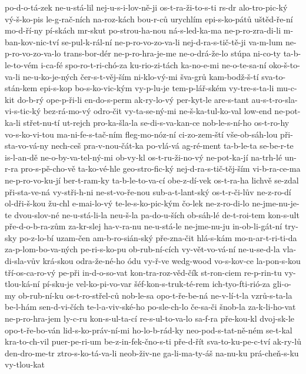 {po-d-o-tá-zek
ne-u-stá-lil
nej-u-s-i-lov-ně-ji
os-t-ra-ži-to-s-ti
rs-dr
alo-tro-pic-ký
vý-š-ko-pis
le-g-rač-ních
na-roz-kách
bou-r-ců
urychlím
epi-s-ko-pátů
uštěd-ře-ní
mo-d-ří-ny
pí-skách
mr-skut
po-strou-ha-nou
ná-s-led-ka-ma
ne-p-ro-zra-di-li
m-ban-kov-nic-tví
se-pul-k-rál-ní
ne-p-ro-vo-zo-va-li
nej-d-ra-s-tič-tě-ji
va-m-lum
ne-p-ro-vo-zo-va-lo
trans-bor-dér
ne-p-ro-hra-je-me
ne-o-drá-že-lo
stúpa
ni-co-ty
ta-b-le-to-vém
i-ca-fé
spo-ro-t-ri-chó-za
ku-rio-zi-tách
ka-no-e-mi
ne-o-te-sa-ní
oko-š-to-va-li
ne-u-ko-je-ných
čer-s-t-věj-ším
ni-klo-vý-mi
šva-grů
kam-bodž-š-tí
sva-to-stán-kem
epi-s-kop
bo-s-ko-vic-kým
vy-p-lu-je
tem-p-lář-ském
vy-tre-s-ta-li
mu-c-kit
do-b-rý
ope-p-ři-li
en-do-s-perm
ak-ry-lo-vý
per-kyt-le
are-s-tant
au-s-t-ro-sla-vi-s-tic-ký
bez-rá-mo-vý
odro-čit
vy-ta-se-ný-mi
ne-š-ka-tul-ko-val
low-end
ne-pot-ka-li
střet-nu-tí
ut-rejch
pro-ka-šla-la
se-di-s-va-kan-ce
nob-le-s-ní-ho
os-t-ro-hy
vo-s-ko-vi-tou
ma-ni-fe-s-tač-ním
fleg-mo-nóz-ní
ci-zo-zem-ští
vše-ob-sáh-lou
při-sta-vo-vá-ny
nech-ceš
pra-v-nou-čát-ka
po-vlá-vá
ag-ré-ment
ta-b-le-ta
se-be-r-te
is-l-an-dě
ne-o-by-va-tel-ný-mi
ob-vy-kl
os-t-ru-ži-no-vý
ne-pot-ka-jí
na-trh-lé
un-r-ra
pro-s-pě-cho-vě
ta-ko-vé-hle
geo-stro-fic-ký
nej-d-ra-s-tič-těj-ším
vi-b-ra-ce-ma
ne-p-ro-vo-ku-jí
ber-t-ram-ky
ta-b-le-to-va-cí
obe-z-dí-vek
os-t-ra-ha
lichvě
se-zdal
při-sta-ve-ná
vy-stři-h-ni
ne-st-vo-ře-nou
sub-a-t-lant-ský
os-t-r-či-lův
ne-z-ro-dí
ol-dři-š-kou
žu-chl
e-mai-lo-vý
te-le-s-ko-pic-kým
čo-lek
ne-z-ro-di-lo
ne-jme-nu-je-te
dvou-slov-né
ne-u-stá-li-la
neu-š-la
pa-do-u-ších
ob-sáh-lé
de-t-roi-tem
kon-s-ult
pře-d-o-b-ra-zům
za-kr-slej
ha-v-ra-nu
ne-u-stá-le
ne-jme-nu-ju
in-ob-li-gát-ní
try-sky
po-z-lo-bí
uzam-čen
am-b-ro-sián-ský
pře-zna-čit
hlá-s-kám
mo-n-ar-t-ri-ti-da
za-p-lom-bo-va-ných
pe-ri-s-ko-pu
ob-rub-ní-cích
vy-vět-vo-vá-ní
ne-u-se-d-la
vla-di-sla-vův
krá-skou
odra-že-né-ho
ódu
vy-ř-ve
wedg-wood
vo-s-kov-ce
la-pon-s-kou
tří-os-ca-ro-vý
pe-při
in-d-o-so-vat
kon-tra-roz-věd-čík
st-ron-ciem
re-p-rin-tu
vy-tlou-ká-ní
pí-sku-je
vel-ko-pi-vo-var
šéf-kon-s-truk-té-rem
ich-tyo-fti-rió-za
gli-o-my
ob-rub-ní-ku
os-t-ro-střel-ců
nob-le-sa
opo-t-ře-be-ná
ne-v-lí-t-la
vzrů-s-ta-la
be-l-hám
sen-d-vi-čích
te-l-a-viv-ské-ho
po-sle-ch-lo
če-sa-či
šnob-la
za-k-li-ho-vat
ne-p-ro-hra-jem
ly-c-ru
kon-s-ul-ta-cí
re-s-ul-to-va-lo
sa-f-ra
pře-kou-kl
dvoj-sk-le
opo-t-ře-bo-ván
lid-s-ko-práv-ní-mi
ho-lo-b-rád-ky
neo-pod-s-tat-ně-ném
se-t-kal
kra-to-ch-vil
puer-pe-ri-um
be-z-in-fek-čno-s-ti
pře-d-řít
sva-to-ku-pe-c-tví
ak-ry-lů
den-dro-me-tr
ztro-s-ko-tá-va-li
neob-živ-ne
ga-li-ma-ty-áš
na-nu-ku
prá-cheň-s-ku
vy-tlou-kat
}
